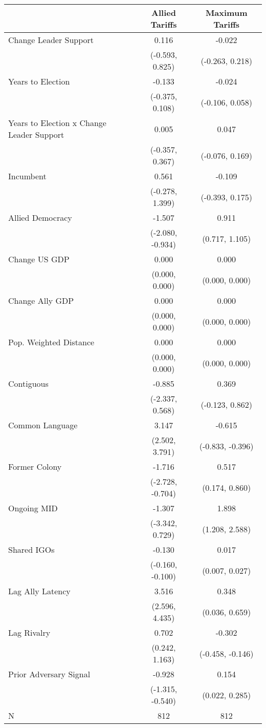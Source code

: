 
\begin{tabular}[t]{lcc}
\toprule
  & Allied Tariffs & Maximum Tariffs\\
\midrule
Change Leader Support & 0.116 & -0.022\\
 & (-0.593, 0.825) & (-0.263, 0.218)\\
Years to Election & -0.133 & -0.024\\
 & (-0.375, 0.108) & (-0.106, 0.058)\\
Years to Election x Change Leader Support & 0.005 & 0.047\\
 & (-0.357, 0.367) & (-0.076, 0.169)\\
Incumbent & 0.561 & -0.109\\
 & (-0.278, 1.399) & (-0.393, 0.175)\\
Allied Democracy & -1.507 & 0.911\\
 & (-2.080, -0.934) & (0.717, 1.105)\\
Change US GDP & 0.000 & 0.000\\
 & (0.000, 0.000) & (0.000, \vphantom{2} 0.000)\\
Change Ally GDP & 0.000 & 0.000\\
 & (0.000, 0.000) & (0.000, \vphantom{1} 0.000)\\
Pop. Weighted Distance & 0.000 & 0.000\\
 & (0.000, 0.000) & (0.000, 0.000)\\
Contiguous & -0.885 & 0.369\\
 & (-2.337, 0.568) & (-0.123, 0.862)\\
Common Language & 3.147 & -0.615\\
 & (2.502, 3.791) & (-0.833, -0.396)\\
Former Colony & -1.716 & 0.517\\
 & (-2.728, -0.704) & (0.174, 0.860)\\
Ongoing MID & -1.307 & 1.898\\
 & (-3.342, 0.729) & (1.208, 2.588)\\
Shared IGOs & -0.130 & 0.017\\
 & (-0.160, -0.100) & (0.007, 0.027)\\
Lag Ally Latency & 3.516 & 0.348\\
 & (2.596, 4.435) & (0.036, 0.659)\\
Lag Rivalry & 0.702 & -0.302\\
 & (0.242, 1.163) & (-0.458, -0.146)\\
Prior Adversary Signal & -0.928 & 0.154\\
 & (-1.315, -0.540) & (0.022, 0.285)\\
\midrule
N & 812 & 812\\
\bottomrule
\end{tabular}

